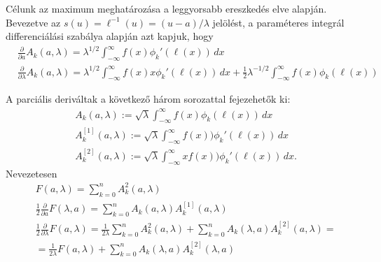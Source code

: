 \documentclass[oneside,titlepage,12pt,a4paper]{report}
\begin{document}
C\'elunk az
 maximum meghat\'aroz\'asa a leggyorsabb ereszked\'es elve alapj\'an. Bevezetve az $s(u)=\ell^{-1}(u)=(u-a)/\lambda$ jel\"ol\'est, a  param\'eteres integr\'al differenci\'al\'asi szab\'alya alapj\'an  azt kapjuk, hogy
\begin{equation}
\begin{split}
&\frac \partial {\partial a}A_k(a,\lambda)=\lambda^{1/2} \int_{-\infty}^\infty f(x)\phi_k'(\ell(x))\, dx\\
 &\frac \partial {\partial \lambda}A_k(a,\lambda)=\lambda^{1/2} \int_{-\infty}^\infty f(x)x\phi_k'(\ell(x))\, dx+\frac 12\lambda^{-1/2}\int_{-\infty}^\infty f(x)\phi_k(\ell(x))
 \end{split}
 \end{equation}

 A parci\'alis deriv\'altak a k\"ovetkez\H o h\'arom sorozattal fejezehet\H ok ki:
 \begin{equation}
 \begin{split}
 &A_k(a,\lambda):=\sqrt{\lambda}\int_{-\infty}^\infty f(x)\phi_k(\ell(x))\, dx\\
 &A_k^{[1]}(a,\lambda):=\sqrt{\lambda}\int_{-\infty}^\infty f(x))\phi_k'(\ell(x))\, dx\\
 &A_k^{[2]}(a,\lambda):=\sqrt{\lambda}\int_{-\infty}^\infty xf(x))\phi_k'(\ell(x))\, dx.
 \end{split}
  \end{equation}
Nevezetesen
\begin{equation}
\begin{split}
&F(a,\lambda)=\sum_{k=0}^n A_k^2(a,\lambda)\\
&\frac 12\frac \partial{\partial a} F(\lambda, a)=\sum_{k=0}^n A_k(a,\lambda)A_k^{[1]}(a,\lambda)\\
&\frac 12\frac \partial{\partial \lambda} F(a,\lambda)=\frac 1{2\lambda}\sum_{k=0}^n A_k^2(a,\lambda)+\sum_{k=0}^n A_k(\lambda,a)A_k^{[2]}(a,\lambda)=\\
&=\frac 1{2\lambda} F(a,\lambda )+\sum_{k=0}^n A_k(\lambda,a)A_k^{[2]}(\lambda,a)
\end{split}
\end{equation}
\end{document}
